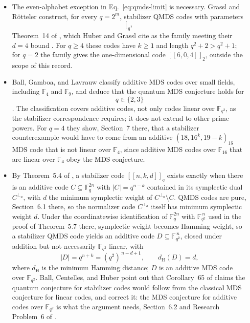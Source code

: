 \begin{itemize}
  \item The even-alphabet exception in Eq.~\eqref{eq:qmds-limit} is necessary.
Grassl and R\"otteler construct, for every $q=2^{m}$, stabilizer QMDS codes
with parameters
\begin{equation}
  [[q^{2}+2,\;q^{2}-4,\;4]]_q,
  \label{eq:qmds-even-family}
\end{equation}
Theorem~14 of , which Huber and
Grassl cite as the family meeting their $d=4$ bound
.  For $q\geq4$ these codes have
$k\geq1$ and length $q^{2}+2>q^{2}+1$; for $q=2$ the family gives the
one-dimensional code $[[6,0,4]]_2$, outside the scope of this record.

  \item Ball, Gamboa, and Lavrauw classify additive MDS codes over small fields,
including $\mathbb{F}_{4}$ and $\mathbb{F}_{9}$, and deduce that the
quantum MDS conjecture holds for
\begin{equation}
  q\in\{2,3\}
  \label{eq:qmds-small-alphabets}
\end{equation}
.  The classification
covers additive codes, not only codes linear over $\mathbb{F}_{q^{2}}$, as
the stabilizer correspondence requires; it does not extend to other prime
powers.  For $q=4$ they show, Section~7 there, that a stabilizer
counterexample would have to come from an additive
$(18,16^{k},19-k)_{16}$ MDS code that is not linear over $\mathbb{F}_{4}$,
since additive MDS codes over $\mathbb{F}_{16}$ that are linear over
$\mathbb{F}_{4}$ obey the MDS conjecture.

  \item By Theorem~5.4 of , a
stabilizer code $[[n,k,d]]_q$ exists exactly when there is an additive code
$C\subseteq\mathbb{F}_{q}^{2n}$ with $|C|=q^{n-k}$ contained in its
symplectic dual $C^{\perp_a}$, with $d$ the minimum symplectic weight of
$C^{\perp_a}\setminus C$.  QMDS codes are pure, Section~6.1 there, so the
normalizer code $C^{\perp_a}$ itself has minimum symplectic weight $d$.
Under the coordinatewise identification of $\mathbb{F}_{q}^{2n}$ with
$\mathbb{F}_{q^{2}}^{\,n}$ used in the proof of Theorem~5.7 there,
symplectic weight becomes Hamming weight, so a stabilizer QMDS code yields
an additive code $D\subseteq\mathbb{F}_{q^{2}}^{\,n}$, closed under addition
but not necessarily $\mathbb{F}_{q^{2}}$-linear, with
\begin{equation}
  |D|=q^{n+k}=(q^{2})^{\,n-d+1},
  \qquad
  d_{\mathrm{H}}(D)=d,
  \label{eq:qmds-additive-code}
\end{equation}
where $d_{\mathrm{H}}$ is the minimum Hamming distance; $D$ is an additive
MDS code over $\mathbb{F}_{q^{2}}$.  Ball, Centelles, and Huber point out
that Corollary~65 of  claims the
quantum conjecture for stabilizer codes would follow from the classical MDS
conjecture for linear codes, and correct it: the MDS conjecture for
additive codes over $\mathbb{F}_{q^{2}}$ is what the argument needs,
Section~6.2 and Research Problem~6 of
.
\end{itemize}

